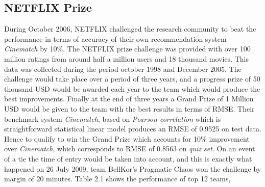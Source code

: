 \subsection{NETFLIX Prize}
During October 2006, NETFLIX challenged the research community to beat the
performance in terms of accuracy of their own recommendation system
\emph{Cinematch} by 10\%. The NETFLIX prize challenge was provided with over 100
million ratings from around half a million users and 18 thousand movies. This
data was collected during the period october 1998 and December 2005. The
challenge would take place over a period of three years, and a progress prize of
50 thousand USD would be awarded each year to the team which would produce the
best improvements. Finally at the end of three years a Grand Prize of 1 Million
USD would be given to the team with the best results in terms of RMSE. Their
benchmark system \emph{Cinematch}, based on \emph{Pearson correlation} which is
straightforward statistical linear model produces an RMSE of 0.9525 on test
data. Hence to qualify to win the Grand Prize which accounts for 10\%
improvement over \emph{Cinematch}, which corresponds to RMSE of 0.8563 on
\emph{quiz set}. On an event of a tie the time of entry would be taken into
account, and this is exactly what happened on 26 July 2009, team BellKor's
Pragmatic Chaos won the challenge by margin of 20 minutes. Table 2.1 shows the
performance of top 12 teams, \cite{NETFLIX_Prize:Online}
